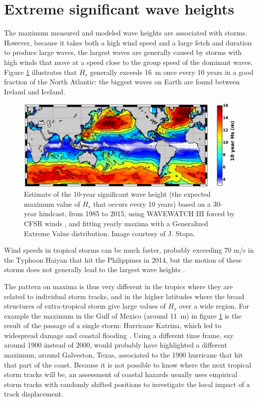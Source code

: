 \section{Extreme significant wave heights}
The maximum measured and modeled wave heights are associated with storms. However, because it takes both a high wind speed 
and a large fetch and duration to produce large waves, the largest waves are generally caused by storms with high winds that move 
at a speed close to the group speed of the dominant waves. Figure \ref{fig:10yearHsWW3} illustrates that $H_s$ generally exceeds 16~m once 
every 10 years in a good fraction of the North Atlantic: the biggest waves on Earth are found between Ireland and Iceland. 

\begin{figure}[htb]
\centerline{\includegraphics[width=1.0\textwidth]{FIGS_CH_STORMS/10yearHs_WW3.pdf}}
  \caption{Estimate of the 10-year significant wave height (the expected maximum value of $H_s$ that occurs every 10 years) based on a 
  30-year hindcast, from 1985 to 2015, using WAVEWATCH III forced by CFSR winds \cite{Saha&al.2010}, and fitting yearly maxima with a Generalized Extreme Value distribution. Image courtesy of J. Stopa.}
  \label{fig:10yearHsWW3}
\end{figure}
Wind speeds in tropical storms can be much faster, probably exceeding 70 m/s in the Typhoon Haiyan that hit the Philippines in 2014, but
the motion of these storms does not generally lead to the largest wave heights \citep[see also][]{Quilfen&al.2010}. 

The pattern on maxima is thus very different in the tropics where they are related to individual storm tracks, and in the 
higher latitudes where the broad structures of extra-tropical storm give large values of $H_s$ over a wide region. 
For example the maximum in the Gulf of Mexico (around 11~m) in figure \ref{fig:10yearHsWW3} is the result of the passage of a 
single storm: Hurricane Katrina, which led to widespread damage and coastal flooding \citep[e.g.][]{Resio&Westerink2008}. 
Using a different time frame, say around 1900 instead of 2000, would probably have highlighted a different maximum, around Galveston, Texas, 
associated to the 1900 hurricane that hit that part of the coast. 
Because it is not possible to know where the next tropical storm tracks will be, an assessment of coastal hazards usually uses 
empirical storm tracks with randomly shifted positions to investigate the local impact of a track displacement. 

